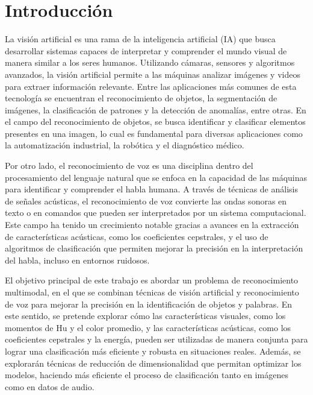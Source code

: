 \documentclass[12pt,a4paper]{article}
\begin{document}
\section{Introducción}

La visión artificial es una rama de la inteligencia artificial (IA) que busca desarrollar sistemas capaces de interpretar y comprender el mundo visual de manera similar a los seres humanos. Utilizando cámaras, sensores y algoritmos avanzados, la visión artificial permite a las máquinas analizar imágenes y videos para extraer información relevante. Entre las aplicaciones más comunes de esta tecnología se encuentran el reconocimiento de objetos, la segmentación de imágenes, la clasificación de patrones y la detección de anomalías, entre otras. En el campo del reconocimiento de objetos, se busca identificar y clasificar elementos presentes en una imagen, lo cual es fundamental para diversas aplicaciones como la automatización industrial, la robótica y el diagnóstico médico.

Por otro lado, el reconocimiento de voz es una disciplina dentro del procesamiento del lenguaje natural que se enfoca en la capacidad de las máquinas para identificar y comprender el habla humana. A través de técnicas de análisis de señales acústicas, el reconocimiento de voz convierte las ondas sonoras en texto o en comandos que pueden ser interpretados por un sistema computacional. Este campo ha tenido un crecimiento notable gracias a avances en la extracción de características acústicas, como los coeficientes cepstrales, y el uso de algoritmos de clasificación que permiten mejorar la precisión en la interpretación del habla, incluso en entornos ruidosos.

El objetivo principal de este trabajo es abordar un problema de reconocimiento multimodal, en el que se combinan técnicas de visión artificial y reconocimiento de voz para mejorar la precisión en la identificación de objetos y palabras. En este sentido, se pretende explorar cómo las características visuales, como los momentos de Hu y el color promedio, y las características acústicas, como los coeficientes cepstrales y la energía, pueden ser utilizadas de manera conjunta para lograr una clasificación más eficiente y robusta en situaciones reales. Además, se explorarán técnicas de reducción de dimensionalidad que permitan optimizar los modelos, haciendo más eficiente el proceso de clasificación tanto en imágenes como en datos de audio.


\end{document}
